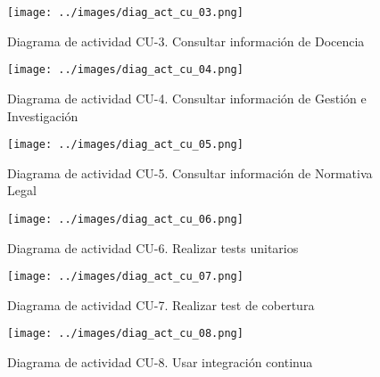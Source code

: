 \begin{figure}[!ht]
  \begin{center}
  \texttt{[image: ../images/diag\_act\_cu\_03.png]}
  \caption{Diagrama de actividad CU-3. Consultar información de Docencia}
  \label{fig:diag_act_cu_03}
  \end{center}
\end{figure}

\begin{figure}[!ht]
  \begin{center}
  \texttt{[image: ../images/diag\_act\_cu\_04.png]}
  \caption{Diagrama de actividad CU-4. Consultar información de Gestión e Investigación}
  \label{fig:diag_act_cu_04}
  \end{center}
\end{figure}

\begin{figure}[!ht]
  \begin{center}
  \texttt{[image: ../images/diag\_act\_cu\_05.png]}
  \caption{Diagrama de actividad CU-5. Consultar información de Normativa Legal}
  \label{fig:diag_act_cu_05}
  \end{center}
\end{figure}

\begin{figure}[!ht]
  \begin{center}
  \texttt{[image: ../images/diag\_act\_cu\_06.png]}
  \caption{Diagrama de actividad CU-6. Realizar tests unitarios}
  \label{fig:diag_act_cu_06}
  \end{center}
\end{figure}

\begin{figure}[!ht]
  \begin{center}
  \texttt{[image: ../images/diag\_act\_cu\_07.png]}
  \caption{Diagrama de actividad CU-7. Realizar test de cobertura}
  \label{fig:diag_act_cu_07}
  \end{center}
\end{figure}

\begin{figure}[!ht]
  \begin{center}
  \texttt{[image: ../images/diag\_act\_cu\_08.png]}
  \caption{Diagrama de actividad CU-8. Usar integración continua}
  \label{fig:diag_act_cu_08}
  \end{center}
\end{figure}

